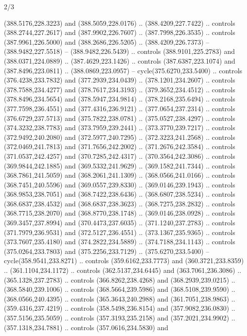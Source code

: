 \begin{flagdescription}{2/3}
\begin{scope}[xshift=0.5\flaglength,yshift=0.5\flagwidth,scale=\flagwidth/495.65]
\begin{scope}[y=0.8pt, x=0.8pt, yscale=-1,shift={(-463.76,-309.78)}]
  (388.5176,228.3223) and (388.5059,228.0176) .. (388.4209,227.7422) .. controls
  (388.2744,227.2617) and (387.9902,226.7607) .. (387.7998,226.3535) .. controls
  (387.9961,226.5000) and (388.2686,226.5205) .. (388.4209,226.7373) --
  (388.9482,227.5518) -- (388.9482,226.5439) .. controls (388.9101,225.2783) and
  (388.0371,224.0889) .. (387.4629,223.1426) .. controls (387.6387,223.1074) and
  (387.8496,223.0811) .. (388.0869,223.0957) -- cycle(375.6270,233.5400) ..
  controls (376.4238,233.7832) and (377.2939,234.0439) .. (378.1201,234.2607) ..
  controls (378.7588,234.4277) and (378.7617,234.3193) .. (379.3652,234.4512) ..
  controls (378.8496,234.5654) and (378.5947,234.9814) .. (378.2168,235.6494) ..
  controls (377.7598,236.4551) and (377.4316,236.9121) .. (377.0654,237.2314) ..
  controls (376.6729,237.5713) and (375.7822,238.0781) .. (375.0527,238.4297) ..
  controls (374.3232,238.7783) and (373.7959,239.2441) .. (373.3770,239.7217) ..
  controls (372.9492,240.2080) and (372.5977,240.7295) .. (372.3223,241.2568) ..
  controls (372.0469,241.7813) and (371.7656,242.2002) .. (371.2676,242.3584) ..
  controls (371.0537,242.4257) and (370.7285,242.4317) .. (370.3564,242.3086) ..
  controls (369.9844,242.1885) and (369.5332,241.9629) .. (369.1582,241.7344) ..
  controls (368.7861,241.5059) and (368.2061,241.1309) .. (368.0566,241.0166) ..
  controls (368.7451,240.5596) and (369.0557,239.8330) .. (369.0146,239.1943) ..
  controls (368.9853,238.7051) and (368.7422,238.6436) .. (368.6807,238.5234) ..
  controls (368.6837,238.4532) and (368.6837,238.3623) .. (368.7275,238.2832) ..
  controls (368.7715,238.2070) and (368.8770,238.1748) .. (369.0146,238.0928) ..
  controls (369.3457,237.8994) and (370.4473,237.6035) .. (371.1240,237.2783) ..
  controls (371.7979,236.9531) and (372.5127,236.4551) .. (373.1367,235.9365) ..
  controls (373.7607,235.4180) and (374.2822,234.5889) .. (374.7188,234.1143) ..
  controls (375.0264,233.7803) and (375.2256,233.7129) .. (375.6270,233.5400) --
  cycle(358.9541,233.8271) .. controls (359.6162,233.7773) and
  (360.3721,233.8359) .. (361.1104,234.1172) .. controls (362.5137,234.6445) and
  (363.7061,236.3086) .. (365.1328,237.2783) .. controls (366.8262,238.4268) and
  (368.2939,239.0215) .. (368.5840,239.1006) .. controls (368.5664,239.5986) and
  (368.5108,239.9590) .. (368.0566,240.4395) .. controls (365.3643,240.2988) and
  (361.7051,238.9863) .. (359.4316,237.4219) .. controls (358.5498,236.8154) and
  (357.9082,236.0830) .. (357.5156,235.5059) .. controls (357.3193,235.2158) and
  (357.2021,234.9902) .. (357.1318,234.7881) .. controls (357.0616,234.5830) and

\end{scope}
\end{scope}
\end{flagdescription}
